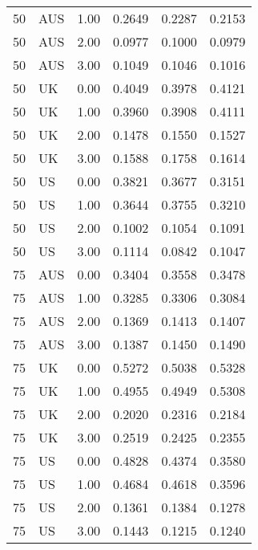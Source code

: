 \begin{table}[ht]
\begin{tabular}{llrlll}
  50 & AUS & 1.00 & 0.2649 & 0.2287 & 0.2153 \\ 
  50 & AUS & 2.00 & 0.0977 & 0.1000 & 0.0979 \\ 
  50 & AUS & 3.00 & 0.1049 & 0.1046 & 0.1016 \\ 
  50 & UK & 0.00 & 0.4049 & 0.3978 & 0.4121 \\ 
  50 & UK & 1.00 & 0.3960 & 0.3908 & 0.4111 \\ 
  50 & UK & 2.00 & 0.1478 & 0.1550 & 0.1527 \\ 
  50 & UK & 3.00 & 0.1588 & 0.1758 & 0.1614 \\ 
  50 & US & 0.00 & 0.3821 & 0.3677 & 0.3151 \\ 
  50 & US & 1.00 & 0.3644 & 0.3755 & 0.3210 \\ 
  50 & US & 2.00 & 0.1002 & 0.1054 & 0.1091 \\ 
  50 & US & 3.00 & 0.1114 & 0.0842 & 0.1047 \\ 
  75 & AUS & 0.00 & 0.3404 & 0.3558 & 0.3478 \\ 
  75 & AUS & 1.00 & 0.3285 & 0.3306 & 0.3084 \\ 
  75 & AUS & 2.00 & 0.1369 & 0.1413 & 0.1407 \\ 
  75 & AUS & 3.00 & 0.1387 & 0.1450 & 0.1490 \\ 
  75 & UK & 0.00 & 0.5272 & 0.5038 & 0.5328 \\ 
  75 & UK & 1.00 & 0.4955 & 0.4949 & 0.5308 \\ 
  75 & UK & 2.00 & 0.2020 & 0.2316 & 0.2184 \\ 
  75 & UK & 3.00 & 0.2519 & 0.2425 & 0.2355 \\ 
  75 & US & 0.00 & 0.4828 & 0.4374 & 0.3580 \\ 
  75 & US & 1.00 & 0.4684 & 0.4618 & 0.3596 \\ 
  75 & US & 2.00 & 0.1361 & 0.1384 & 0.1278 \\ 
  75 & US & 3.00 & 0.1443 & 0.1215 & 0.1240 \\ 
   \hline
\end{tabular}
\end{table}
